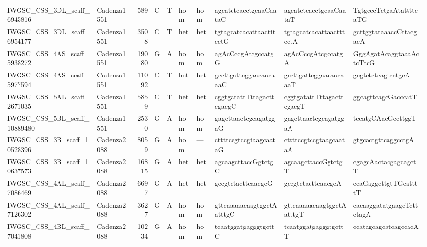 \begin{tabular}{llrlllllll}
 IWGSC\_CSS\_3DL\_scaff\_6945816  & Cadenza1551 &        589 & C         & T        & hom            & hom         & agcatctcacctgcaaCaataC    & agcatctcacctgcaaCaataT    & TgtgcccTctgaAtattttcaTG   \\
 IWGSC\_CSS\_3DL\_scaff\_6954177  & Cadenza1551 &       3508 & C         & T        & het            & het         & tgtagcatcacattaactttcctG  & tgtagcatcacattaactttcctA  & gcttggtataaaccCttacgacA   \\
 IWGSC\_CSS\_4AS\_scaff\_5938272  & Cadenza1551 &      19080 & G         & A        & hom            & hom         & agAcCccgAtcgccatgG        & agAcCccgAtcgccatgA        & GggAgatAcaggtaaaActcTtcG  \\
 IWGSC\_CSS\_4AS\_scaff\_5977594  & Cadenza1551 &      11092 & C         & T        & het            & het         & gccttgattcggaacaacaaaC    & gccttgattcggaacaacaaaT    & gcgtctctcagtcctgcA        \\
 IWGSC\_CSS\_5AL\_scaff\_2671035  & Cadenza1551 &       5859 & C         & T        & het            & het         & cggtgatattTttagacttcgacgC & cggtgatattTttagacttcgacgT & ggcagttcagcGacccatT       \\
 IWGSC\_CSS\_5BL\_scaff\_10889480 & Cadenza1551 &       2530 & G         & A        & hom            & hom         & gagcttaactcgcagatggaG     & gagcttaactcgcagatggaA     & tccatgCAacGccttggT        \\
 IWGSC\_CSS\_3B\_scaff\_10528396  & Cadenza2088 &       8059 & G         & A        & hom            & ---         & cttttccgtccgtaagcaataG    & cttttccgtccgtaagcaataA    & gtgcactgttcaggcctgA       \\
 IWGSC\_CSS\_3B\_scaff\_10637573  & Cadenza2088 &      16815 & G         & A        & het            & het         & agcaagcttaccGgtctgC       & agcaagcttaccGgtctgT       & cgagcAactacgagcagctT      \\
 IWGSC\_CSS\_4AL\_scaff\_7086469  & Cadenza2088 &       6697 & G         & A        & het            & het         & gccgtctacttcaacgcG        & gccgtctacttcaacgcA        & ccaGaggcttgtTGcattttT     \\
 IWGSC\_CSS\_4AL\_scaff\_7126302  & Cadenza2088 &       3627 & G         & A        & hom            & hom         & gttcaaaaacaagtggctAatttgC & gttcaaaaacaagtggctAatttgT & cacaaggatatgaagcTcttctagA \\
 IWGSC\_CSS\_4BL\_scaff\_7041808  & Cadenza2088 &      10234 & G         & A        & hom            & hom         & tcaatggatgagggtgcttC      & tcaatggatgagggtgcttT      & ccatagcagcatcagccacA      \\

\end{tabular}

